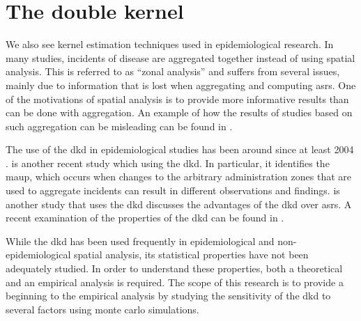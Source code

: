 \section{The double kernel}

We also see kernel estimation techniques used in epidemiological research.
In many studies,
incidents of disease are aggregated together instead of using spatial analysis.
This is referred to as ``zonal analysis'' and suffers from several issues,
mainly due to information that is lost when aggregating and computing \glspl{asr}.
One of the motivations of spatial analysis is to provide more informative results than can be done with aggregation.
An example of how the results of studies based on such aggregation can be misleading can be found in \citet{portnov2007ecological}.

The use of the \acrfull{dkd} in epidemiological studies has been around since at least 2004 \citep{rushton2004analyzing}.
\citet{kloog2009using} is another recent study which using the \gls{dkd}.
In particular, it identifies the \gls{maup},
which occurs when changes to the arbitrary administration zones that are used to aggregate incidents can result in different observations and findings.
\citet{zusman2012residential} is another study that uses the \gls{dkd} discusses the advantages of the \gls{dkd} over \glspl{asr}.
A recent examination of the properties of the \gls{dkd} can be found in \citet{zusman2016application}.

While the \gls{dkd} has been used frequently in epidemiological and non-epidemiological spatial analysis,
its statistical properties have not been adequately studied.
In order to understand these properties,
both a theoretical and an empirical analysis is required.
The scope of this research is to provide a beginning to the empirical analysis by studying the sensitivity of the \gls{dkd} to several factors using monte carlo simulations.

